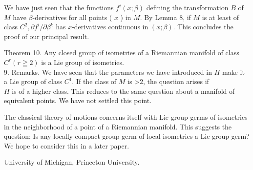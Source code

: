 \documentclass[10pt]{article}
\begin{document}
We have just seen that the functions $f^{i}(x ; \beta)$ defining the transformation $B$ of $M$ have $\beta$-derivatives for all points ( $x$ ) in $M$. By Lemma 8, if $M$ is at least of class $C^{2}, \partial f^{i} / \partial \beta^{k}$ has $x$-derivatives continuous in $(x ; \beta)$. This concludes the proof of our principal result.

Theorem 10. Any closed group of isometries of a Riemannian manifold of class $C^{r}(r \geqq 2)$ is a Lie group of isometries.\\
9. Remarks. We have seen that the parameters we have introduced in $H$ make it a Lie group of class $C^{1}$. If the class of $M$ is >2, the question arises if\\
$H$ is of a higher class. This reduces to the same question about a manifold of equivalent points. We have not settled this point.

The classical theory of motions concerns itself with Lie group germs of isometries in the neighborhood of a point of a Riemannian manifold. This suggests the question: Is any locally compact group germ of local isometries a Lie group germ? We hope to consider this in a later paper.

University of Michigan, Princeton University.
\end{document}
